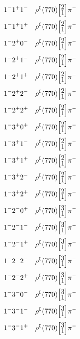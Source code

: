 \documentclass[10pt,a4paper]{article}
\def\dst{\displaystyle}
\def\vsp{\hbox{\vrule height12.5pt depth3.5pt width0pt}}
\def\ells#1#2{\Big[\hskip-5pt\vsp\begin{array}{c}\dst#1\\[-4pt]\dst#2\end{array}\vsp\hskip-5pt\Big]}
\begin{document}
\begin{align*} 
 \begin{aligned}
1^{-}1^{+}1^{-}\quad & \rho^0(770)\ells{2}{1}\pi^-\\
1^{-}1^{+}1^{+}\quad & \rho^0(770)\ells{2}{1}\pi^-\\
1^{-}2^{+}0^{-}\quad & \rho^0(770)\ells{2}{1}\pi^-\\
1^{-}2^{+}1^{-}\quad & \rho^0(770)\ells{2}{1}\pi^-\\
1^{-}2^{+}1^{+}\quad & \rho^0(770)\ells{2}{1}\pi^-\\
1^{-}2^{+}2^{-}\quad & \rho^0(770)\ells{2}{1}\pi^-\\
1^{-}2^{+}2^{+}\quad & \rho^0(770)\ells{2}{1}\pi^-\\
1^{-}3^{+}0^{+}\quad & \rho^0(770)\ells{2}{1}\pi^-\\
1^{-}3^{+}1^{-}\quad & \rho^0(770)\ells{2}{1}\pi^-\\
1^{-}3^{+}1^{+}\quad & \rho^0(770)\ells{2}{1}\pi^-\\
1^{-}3^{+}2^{-}\quad & \rho^0(770)\ells{2}{1}\pi^-\\
1^{-}3^{+}2^{+}\quad & \rho^0(770)\ells{2}{1}\pi^-\\
1^{-}2^{-}0^{+}\quad & \rho^0(770)\ells{3}{1}\pi^-\\
1^{-}2^{-}1^{-}\quad & \rho^0(770)\ells{3}{1}\pi^-\\
1^{-}2^{-}1^{+}\quad & \rho^0(770)\ells{3}{1}\pi^-\\
1^{-}2^{-}2^{-}\quad & \rho^0(770)\ells{3}{1}\pi^-\\
1^{-}2^{-}2^{+}\quad & \rho^0(770)\ells{3}{1}\pi^-\\
1^{-}3^{-}0^{-}\quad & \rho^0(770)\ells{3}{1}\pi^-\\
1^{-}3^{-}1^{-}\quad & \rho^0(770)\ells{3}{1}\pi^-\\
1^{-}3^{-}1^{+}\quad & \rho^0(770)\ells{3}{1}\pi^-\\
\end{aligned} 
 \end{align*}\pagebreak
\end{document}
